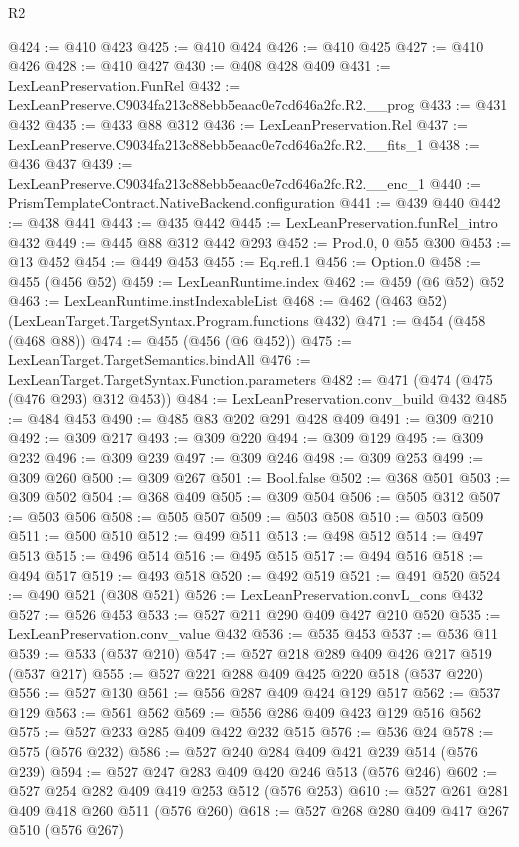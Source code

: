 \begin{lexlean}{R2}
\begin{coremodule}
@424 := @410 @423
@425 := @410 @424
@426 := @410 @425
@427 := @410 @426
@428 := @410 @427
@430 := @408 @428 @409
@431 := LexLeanPreservation.FunRel
@432 := LexLeanPreserve.C9034fa213c88ebb5eaac0e7cd646a2fc.R2.__prog
@433 := @431 @432
@435 := @433 @88 @312
@436 := LexLeanPreservation.Rel
@437 := LexLeanPreserve.C9034fa213c88ebb5eaac0e7cd646a2fc.R2.__fits_1
@438 := @436 @437
@439 := LexLeanPreserve.C9034fa213c88ebb5eaac0e7cd646a2fc.R2.__enc_1
@440 := PrismTemplateContract.NativeBackend.configuration
@441 := @439 @440
@442 := @438 @441
@443 := @435 @442
@445 := LexLeanPreservation.funRel_intro @432
@449 := @445 @88 @312 @442 @293
@452 := Prod.{0, 0} @55 @300
@453 := @13 @452
@454 := @449 @453
@455 := Eq.refl.{1}
@456 := Option.{0}
@458 := @455 (@456 @52)
@459 := LexLeanRuntime.index
@462 := @459 (@6 @52) @52
@463 := LexLeanRuntime.instIndexableList
@468 := @462 (@463 @52) (LexLeanTarget.TargetSyntax.Program.functions @432)
@471 := @454 (@458 (@468 @88))
@474 := @455 (@456 (@6 @452))
@475 := LexLeanTarget.TargetSemantics.bindAll
@476 := LexLeanTarget.TargetSyntax.Function.parameters
@482 := @471 (@474 (@475 (@476 @293) @312 @453))
@484 := LexLeanPreservation.conv_build @432
@485 := @484 @453
@490 := @485 @83 @202 @291 @428 @409
@491 := @309 @210
@492 := @309 @217
@493 := @309 @220
@494 := @309 @129
@495 := @309 @232
@496 := @309 @239
@497 := @309 @246
@498 := @309 @253
@499 := @309 @260
@500 := @309 @267
@501 := Bool.false
@502 := @368 @501
@503 := @309 @502
@504 := @368 @409
@505 := @309 @504
@506 := @505 @312
@507 := @503 @506
@508 := @505 @507
@509 := @503 @508
@510 := @503 @509
@511 := @500 @510
@512 := @499 @511
@513 := @498 @512
@514 := @497 @513
@515 := @496 @514
@516 := @495 @515
@517 := @494 @516
@518 := @494 @517
@519 := @493 @518
@520 := @492 @519
@521 := @491 @520
@524 := @490 @521 (@308 @521)
@526 := LexLeanPreservation.convL_cons @432
@527 := @526 @453
@533 := @527 @211 @290 @409 @427 @210 @520
@535 := LexLeanPreservation.conv_value @432
@536 := @535 @453
@537 := @536 @11
@539 := @533 (@537 @210)
@547 := @527 @218 @289 @409 @426 @217 @519 (@537 @217)
@555 := @527 @221 @288 @409 @425 @220 @518 (@537 @220)
@556 := @527 @130
@561 := @556 @287 @409 @424 @129 @517
@562 := @537 @129
@563 := @561 @562
@569 := @556 @286 @409 @423 @129 @516 @562
@575 := @527 @233 @285 @409 @422 @232 @515
@576 := @536 @24
@578 := @575 (@576 @232)
@586 := @527 @240 @284 @409 @421 @239 @514 (@576 @239)
@594 := @527 @247 @283 @409 @420 @246 @513 (@576 @246)
@602 := @527 @254 @282 @409 @419 @253 @512 (@576 @253)
@610 := @527 @261 @281 @409 @418 @260 @511 (@576 @260)
@618 := @527 @268 @280 @409 @417 @267 @510 (@576 @267)

\end{coremodule}
\end{lexlean}
